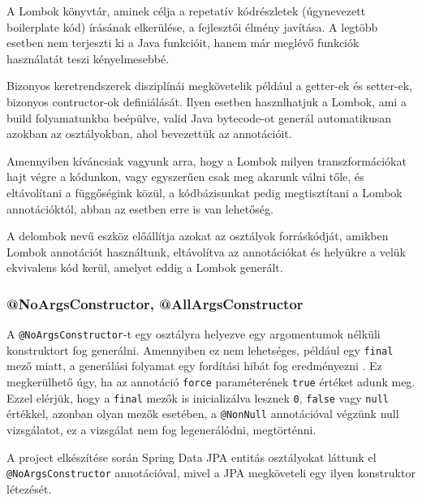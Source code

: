 A Lombok könyvtár, aminek célja a repetatív kódrészletek (úgynevezett boilerplate kód) írásának elkerülése, a fejlesztői élmény javítása. A legtöbb esetben nem terjeszti ki a Java funkcióit, hanem már meglévő funkciók használatát teszi kényelmesebbé. \par

Bizonyos keretrendszerek disziplínái megkövetelik például a getter-ek és setter-ek, bizonyos contructor-ok definiálását. Ilyen esetben hasznlhatjuk a Lombok, ami a build folyamatunkba beépülve, valid Java bytecode-ot generál automatikusan azokban az osztályokban, ahol bevezettük az annotációit.\par

Amennyiben kíváncsiak vagyunk arra, hogy a Lombok milyen transzformációkat hajt végre a kódunkon, vagy egyszerűen csak meg akarunk válni tőle, és eltávolítani a függőségink közül, a kódbázisunkat pedig megtisztítani a Lombok annotációktól, abban az esetben erre is van lehetőség. \par

A delombok nevű eszköz előállítja azokat az osztályok forráskódját, amikben Lombok annotációt használtunk, eltávolítva az annotációkat és helyükre a velük ekvivalens kód kerül, amelyet eddig a Lombok generált. \par


\subsubsection{@NoArgsConstructor, @AllArgsConstructor}

A \lstinline|@NoArgsConstructor|-t egy osztályra helyezve egy argomentumok nélküli konstruktort fog generálni. Amennyiben ez nem lehetséges, például egy \lstinline|final| mező miatt, a generálási folyamat egy fordítási hibát fog eredményezni \cite{lombokConstructorDocumentation}. Ez megkerülhető úgy, ha az annotáció \lstinline|force| paraméterének \lstinline|true| értéket adunk meg. Ezzel elérjük, hogy a \lstinline|final| mezők is inicializálva lesznek \lstinline|0|, \lstinline|false| vagy \lstinline|null| értékkel, azonban olyan mezők esetében, a \lstinline|@NonNull| annotációval végzünk null vizsgálatot, ez a vizsgálat nem fog legenerálódni, megtörténni. \par


A project elkészítése során Spring Data JPA entitás osztályokat láttunk el \lstinline|@NoArgsConstructor| annotációval, mivel a JPA megköveteli egy ilyen konstruktor létezését. \par


